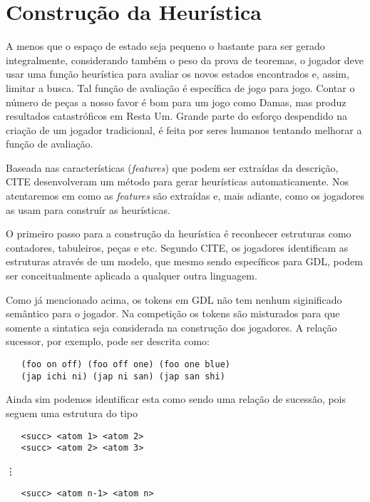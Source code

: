 \section{Construção da Heurística}
A menos que o espaço de estado seja pequeno o bastante para ser gerado
integralmente, considerando também o peso da prova de teoremas, o jogador deve
usar uma função heurística para avaliar os novos estados encontrados e, assim,
limitar a busca. Tal função de avaliação é específica de jogo para jogo. Contar
o número de peças a nosso favor é bom para um jogo como Damas, mas produz
resultados catastróficos em Resta Um. Grande parte do esforço despendido na
criação de um jogador tradicional, é feita por seres humanos tentando melhorar a
função de avaliação.

Baseada nas características ({\it features}) que podem ser extraídas da
descrição, CITE desenvolveram
um método para gerar heurísticas automaticamente. Nos atentaremos em como as
{\it features} são extraídas e, mais adiante, como os jogadores as usam para
construír as heurísticas.

O primeiro passo para a construção da heurística é reconhecer estruturas como
contadores, tabuleiros, peças e etc. Segundo CITE, os jogadores identificam as estruturas através de um
modelo, que mesmo sendo específicos para GDL, podem ser conceitualmente aplicada
a qualquer outra linguagem.

Como já mencionado acima, os tokens em GDL não tem nenhum siginificado semântico
para o jogador. Na competição os tokens são misturados para que somente a
sintatica seja considerada na construção dos jogadores. A relação sucessor, por
exemplo, pode ser descrita como:
\begin{verbatim}
   (foo on off) (foo off one) (foo one blue)
   (jap ichi ni) (jap ni san) (jap san shi)
\end{verbatim}
Ainda sim podemos identificar esta como sendo uma relação de sucessão, pois
seguem uma estrutura do tipo
\begin{verbatim}
   <succ> <atom 1> <atom 2>
   <succ> <atom 2> <atom 3>
\end{verbatim}
\hspace{2cm} \vdots
\begin{verbatim}
   <succ> <atom n-1> <atom n>   
\end{verbatim}
